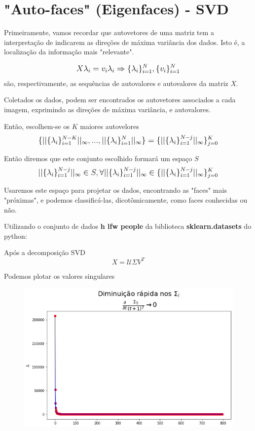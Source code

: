 \documentclass{article}
\begin{document}
\pagebreak

\section{"Auto-faces" (Eigenfaces) - SVD}

\hfill

Primeiramente, vamos recordar que autovetores de uma matriz tem a interpretação de indicarem as direções de máxima variância dos dados. Isto é, a localização da informação mais "relevante".

\begin{equation}
    \mathlarger{
    X \lambda_i = v_i \lambda_i \Rightarrow \{ \lambda_i \}_{i=1}^N,  \{ v_i \}_{i=1}^N
    }
\end{equation}
são, respectivamente, as sequências de autovalores e autovalores da matriz $X$.

Coletados os dados, podem ser encontrados os autovetores associados a cada imagem, exprimindo as direções de máxima variância, e autovalores.

Então, escolhem-se os $K$ maiores autovelores 
\begin{equation}
    \mathlarger{
    \{ || \{ \lambda_i \}_{i=1}^{N-K} ||_{\infty}, ..., || \{ \lambda_i \}_{i=1}^{N} ||_{\infty} \} = \{ || \{ \lambda_i \}_{i=1}^{N-j} ||_{\infty} \}_{j=0}^K
    }
\end{equation}

Então diremos que este conjunto escolhido formará um espaço $S$
\begin{equation}
    \mathlarger{
    || \{ \lambda_i \}_{i=1}^{N-j}||_{\infty} \in S, \forall || \{ \lambda_i \}_{i=1}^{N-j}||_{\infty} \in \{ || \{ \lambda_i \}_{i=1}^{N-j} ||_{\infty} \}_{j=0}^K
    }
\end{equation}

Usaremos este espaço para projetar os dados, encontrando as "faces" mais "próximas", e podemos classificá-las, dicotômicamente, como faces conhecidas ou não.


Utilizando o conjunto de dados \textbf{h lfw people} da biblioteca \textbf{sklearn.datasets} do python:


Após a decomposição SVD
\begin{equation}
    X = \mathcal{U} \Sigma V^T 
\end{equation}

Podemos plotar os valores singulares

\begin{figure}[!ht]
\begin{center}
  \includegraphics[width=0.45\linewidth]{images/S_decaimento.png}
\end{center}
\end{figure}
\end{document}
